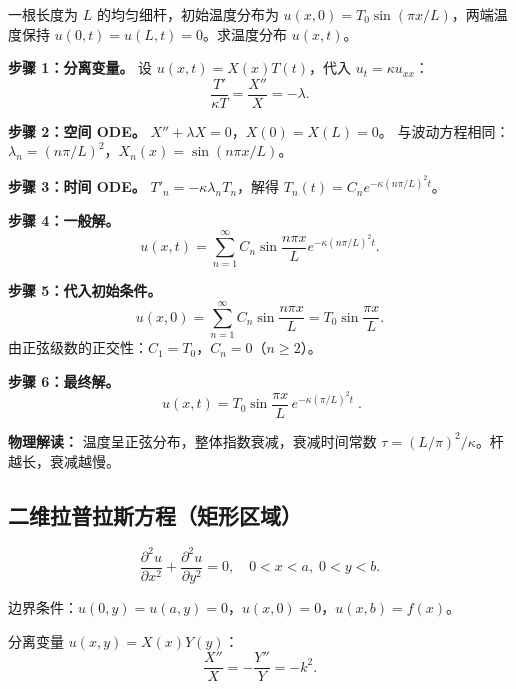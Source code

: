 \begin{example}[两端固定温度的杆]
一根长度为 $L$ 的均匀细杆，初始温度分布为 $u(x,0)=T_0\sin(\pi x/L)$，两端温度保持 $u(0,t)=u(L,t)=0$。求温度分布 $u(x,t)$。

\textbf{步骤 1：分离变量。}
设 $u(x,t)=X(x)T(t)$，代入 $u_t = \kappa u_{xx}$：
\begin{equation}
\frac{T'}{\kappa T} = \frac{X''}{X} = -\lambda.
\end{equation}

\textbf{步骤 2：空间 ODE。}
$X'' + \lambda X = 0$，$X(0)=X(L)=0$。
与波动方程相同：$\lambda_n = (n\pi/L)^2$，$X_n(x)=\sin(n\pi x/L)$。

\textbf{步骤 3：时间 ODE。}
$T'_n = -\kappa\lambda_n T_n$，解得 $T_n(t) = C_n e^{-\kappa (n\pi/L)^2 t}$。

\textbf{步骤 4：一般解。}
\begin{equation}
u(x,t) = \sum_{n=1}^{\infty} C_n \sin\frac{n\pi x}{L} e^{-\kappa (n\pi/L)^2 t}.
\end{equation}

\textbf{步骤 5：代入初始条件。}
\begin{equation}
u(x,0) = \sum_{n=1}^{\infty} C_n \sin\frac{n\pi x}{L} = T_0\sin\frac{\pi x}{L}.
\end{equation}
由正弦级数的正交性：$C_1 = T_0$，$C_n=0$（$n\geq2$）。

\textbf{步骤 6：最终解。}
\begin{equation}
\boxed{\;u(x,t) = T_0\sin\frac{\pi x}{L}\, e^{-\kappa(\pi/L)^2 t}\;}.
\end{equation}

\textbf{物理解读：} 温度呈正弦分布，整体指数衰减，衰减时间常数 $\tau = (L/\pi)^2/\kappa$。杆越长，衰减越慢。
\end{example}

\subsection{二维拉普拉斯方程（矩形区域）}

\begin{equation}
\frac{\partial^2 u}{\partial x^2} + \frac{\partial^2 u}{\partial y^2} = 0,\quad
0<x<a,\;0<y<b.
\end{equation}

边界条件：$u(0,y)=u(a,y)=0$，$u(x,0)=0$，$u(x,b)=f(x)$。

分离变量 $u(x,y)=X(x)Y(y)$：
\begin{equation}
\frac{X''}{X} = -\frac{Y''}{Y} = -k^2.
\end{equation}

